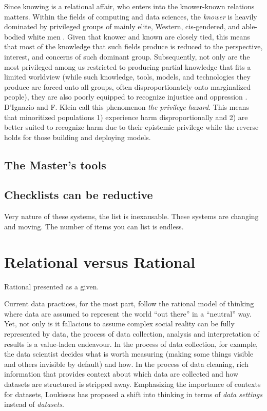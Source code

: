 Since knowing is a relational affair, who enters into the knower-known relations matters. Within the fields of computing and data sciences, the \textit{knower} is heavily dominated by privileged groups of mainly elite, Western, cis-gendered, and able-bodied white men \cite{broussard2018artificial}. Given that knower and known are closely tied, this means that most of the knowledge that such fields produce is reduced to the perspective, interest, and concerns of such dominant group. Subsequently, not only are the most privileged among us restricted to producing partial knowledge that fits a limited worldview (while such knowledge, tools, models, and technologies they produce are forced onto all groups, often disproportionately onto marginalized people), they are also poorly equipped to recognize injustice and oppression \cite{Berenstain2016}. D'Ignazio and F. Klein \cite{d2020data} call this phenomenon \textit{the privilege hazard}. This means that minoritized populations 1) experience harm disproportionally and 2) are better suited to recognize harm due to their epistemic privilege \cite{on1993marginality} while the reverse holds for those building and deploying models.  


\subsection{The Master's tools}


\subsection{Checklists can be reductive}

Very nature of these systems, the list is inexausable. These systems are changing and moving. The number of items you can list is endless. 


\section{Relational versus Rational}

Rational presented as a given. 


Current data practices, for the most part, follow the rational model of thinking where data are assumed to represent the world ``out there'' in a ``neutral'' way. Yet, not only is it fallacious to assume complex social reality can be fully represented by data, the process of data collection, analysis and interpretation of results is a value-laden endeavour. In the process of data collection, for example, the data scientist decides what is worth measuring (making some things visible and others invisible by default) and how. In the process of data cleaning, rich information that provides context about which data are collected and how datasets are structured is stripped away. Emphasizing the importance of contexts for datasets, Loukissas \cite{loukissas2019all} has proposed a shift into thinking in terms of \textit{data settings} instead of \textit{datasets}. 


